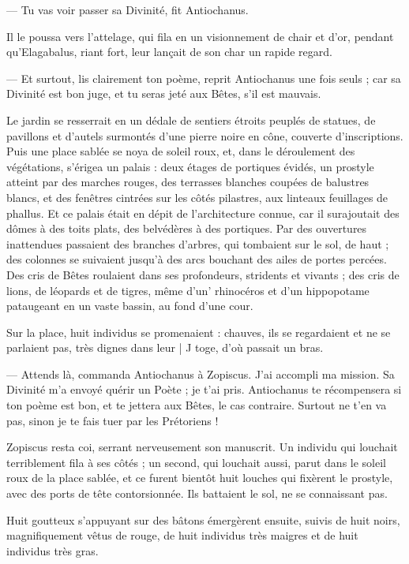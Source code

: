 \documentclass[a4paper, 11pt, oneside, polutonikogreek, french]{article}
\begin{document}
--- Tu vas voir passer sa Divinité, fit Antiochanus.

Il le poussa vers l'attelage, qui fila en un visionnement de chair et d'or, pendant qu'Elagabalus, riant fort, leur lançait de son char un rapide regard.

--- Et surtout, lis clairement ton poème, reprit Antiochanus une fois seuls ; car sa Divinité est bon juge, et tu seras jeté aux Bêtes, s'il est mauvais.

Le jardin se resserrait en un dédale de sentiers étroits peuplés de statues, de pavillons et d'autels surmontés d'une pierre noire en cône, couverte d'inscriptions. Puis une place sablée se noya de soleil roux, et, dans le déroulement des végétations, s'érigea un palais : deux étages de portiques évidés, un prostyle atteint par des marches rouges, des terrasses blanches coupées de balustres blancs, et des fenêtres cintrées sur les côtés pilastres, aux linteaux feuillages de phallus. Et ce palais était en dépit de l'architecture connue, car il surajoutait des dômes à des toits plats, des belvédères à des portiques. Par des ouvertures inattendues passaient des branches d'arbres, qui tombaient sur le sol, de haut ; des colonnes se suivaient jusqu'à des arcs bouchant des ailes de portes percées. Des cris de Bêtes roulaient dans ses profondeurs, stridents et vivants ; des cris de lions, de léopards et de tigres, même d'un' rhinocéros et d'un hippopotame pataugeant en un vaste bassin, au fond d'une cour.

Sur la place, huit individus se promenaient : chauves, ils se regardaient et ne se parlaient pas, très dignes dans leur | J toge, d'où passait un bras.

--- Attends là, commanda Antiochanus à Zopiscus. J'ai accompli ma mission. Sa Divinité m'a envoyé quérir un Poète ; je t'ai pris. Antiochanus te récompensera si ton poème est bon, et te jettera aux Bêtes, le cas contraire. Surtout ne t'en va pas, sinon je te fais tuer par les Prétoriens !

Zopiscus resta coi, serrant nerveusement son manuscrit. Un individu qui louchait terriblement fila à ses côtés ; un second, qui louchait aussi, parut dans le soleil roux de la place sablée, et ce furent bientôt huit louches qui fixèrent le prostyle, avec des ports de tête contorsionnée. Ils battaient le sol, ne se connaissant pas.

Huit goutteux s'appuyant sur des bâtons émergèrent ensuite, suivis de huit noirs, magnifiquement vêtus de rouge, de huit individus très maigres et de huit individus très gras.
\end{document}
